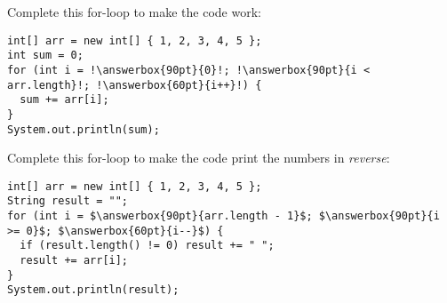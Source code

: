 \begin{complete}
Complete this for-loop to make the code work:

\begin{lstlisting}[escapechar = !]
int[] arr = new int[] { 1, 2, 3, 4, 5 };
int sum = 0;
for (int i = !\answerbox{90pt}{0}!; !\answerbox{90pt}{i < arr.length}!; !\answerbox{60pt}{i++}!) {
  sum += arr[i];
}
System.out.println(sum);
\end{lstlisting}
\end{complete}



\begin{complete}
Complete this for-loop to make the code print the numbers in \emph{reverse}:

\begin{lstlisting}[escapechar = $]
int[] arr = new int[] { 1, 2, 3, 4, 5 };
String result = "";
for (int i = $\answerbox{90pt}{arr.length - 1}$; $\answerbox{90pt}{i >= 0}$; $\answerbox{60pt}{i--}$) {
  if (result.length() != 0) result += " ";
  result += arr[i];
}
System.out.println(result);
\end{lstlisting}
\end{complete}
